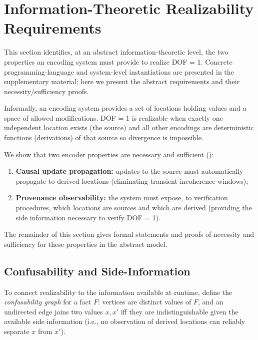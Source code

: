 \section{Information-Theoretic Realizability Requirements}\label{sec:requirements}

This section identifies, at an abstract information-theoretic level, the two properties an encoding system must provide to realize DOF = 1. Concrete programming-language and system-level instantiations are presented in the supplementary material; here we present the abstract requirements and their necessity/sufficiency proofs.

Informally, an encoding system provides a set of locations holding values and a space of allowed modifications. DOF = 1 is realizable when exactly one independent location exists (the source) and all other encodings are deterministic functions (derivations) of that source so divergence is impossible.

We show that two encoder properties are necessary and sufficient ():
\begin{enumerate}
\item \textbf{Causal update propagation:} updates to the source must automatically propagate to derived locations (eliminating transient incoherence windows);
\item \textbf{Provenance observability:} the system must expose, to verification procedures, which locations are sources and which are derived (providing the side information necessary to verify DOF = 1).
\end{enumerate}

The remainder of this section gives formal statements and proofs of necessity and sufficiency for these properties in the abstract model.

\subsection{Confusability and Side-Information}
\label{sec:confusability}

To connect realizability to the information available at runtime, define the \emph{confusability graph} for a fact $F$: vertices are distinct values of $F$, and an undirected edge joins two values $x,x'$ iff they are indistinguishable given the available side information (i.e., no observation of derived locations can reliably separate $x$ from $x'$).


